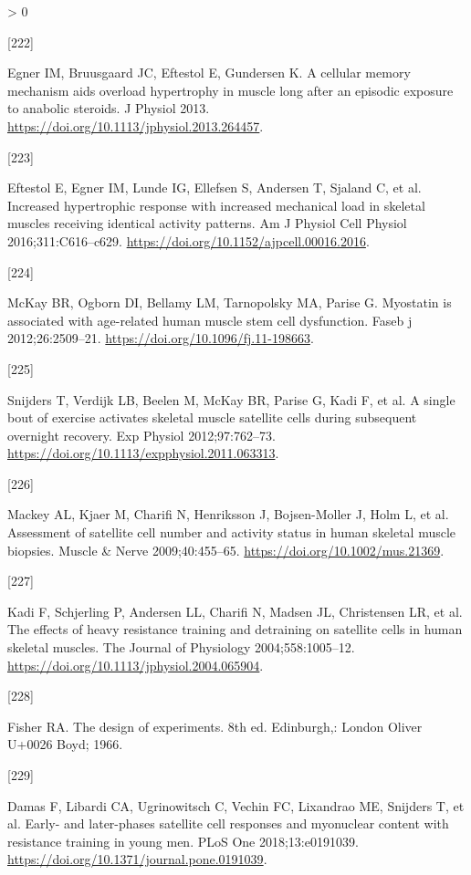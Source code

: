 \documentclass[twoside,10pt]{gihclass} %
\newlength{\cslhangindent}
\newlength{\csllabelwidth}
\newenvironment{CSLReferences}[3] %
 {%
  \setlength{\parindent}{0pt}
  \ifodd #1 \everypar{\setlength{\hangindent}{\cslhangindent}}\ignorespaces\fi
  \ifnum #2 > 0
  \setlength{\parskip}{#2\baselineskip}
  \fi
 }%
 {}
\newcommand{\CSLLeftMargin}[1]{\parbox[t]{\maxof{\widthof{#1}}{\csllabelwidth}}{#1}}
\newcommand{\CSLRightInline}[1]{\parbox[t]{\linewidth}{#1}}
\begin{document}
\begin{CSLReferences}{0}{0}
\leavevmode\hypertarget{ref-RN912}{}%
\CSLLeftMargin{{[}222{]} }
\CSLRightInline{Egner IM, Bruusgaard JC, Eftestol E, Gundersen K. A cellular memory mechanism aids overload hypertrophy in muscle long after an episodic exposure to anabolic steroids. J Physiol 2013. \url{https://doi.org/10.1113/jphysiol.2013.264457}.}

\leavevmode\hypertarget{ref-RN2104}{}%
\CSLLeftMargin{{[}223{]} }
\CSLRightInline{Eftestol E, Egner IM, Lunde IG, Ellefsen S, Andersen T, Sjaland C, et al. Increased hypertrophic response with increased mechanical load in skeletal muscles receiving identical activity patterns. Am J Physiol Cell Physiol 2016;311:C616--c629. \url{https://doi.org/10.1152/ajpcell.00016.2016}.}

\leavevmode\hypertarget{ref-RN2872}{}%
\CSLLeftMargin{{[}224{]} }
\CSLRightInline{McKay BR, Ogborn DI, Bellamy LM, Tarnopolsky MA, Parise G. Myostatin is associated with age-related human muscle stem cell dysfunction. Faseb j 2012;26:2509--21. \url{https://doi.org/10.1096/fj.11-198663}.}

\leavevmode\hypertarget{ref-RN1048}{}%
\CSLLeftMargin{{[}225{]} }
\CSLRightInline{Snijders T, Verdijk LB, Beelen M, McKay BR, Parise G, Kadi F, et al. A single bout of exercise activates skeletal muscle satellite cells during subsequent overnight recovery. Exp Physiol 2012;97:762--73. \url{https://doi.org/10.1113/expphysiol.2011.063313}.}

\leavevmode\hypertarget{ref-RN2081}{}%
\CSLLeftMargin{{[}226{]} }
\CSLRightInline{Mackey AL, Kjaer M, Charifi N, Henriksson J, Bojsen-Moller J, Holm L, et al. Assessment of satellite cell number and activity status in human skeletal muscle biopsies. Muscle \& Nerve 2009;40:455--65. \url{https://doi.org/10.1002/mus.21369}.}

\leavevmode\hypertarget{ref-RN2617}{}%
\CSLLeftMargin{{[}227{]} }
\CSLRightInline{Kadi F, Schjerling P, Andersen LL, Charifi N, Madsen JL, Christensen LR, et al. The effects of heavy resistance training and detraining on satellite cells in human skeletal muscles. The Journal of Physiology 2004;558:1005--12. \url{https://doi.org/10.1113/jphysiol.2004.065904}.}

\leavevmode\hypertarget{ref-RN2004}{}%
\CSLLeftMargin{{[}228{]} }
\CSLRightInline{Fisher RA. The design of experiments. 8th ed. Edinburgh,: London Oliver U+0026 Boyd; 1966.}

\leavevmode\hypertarget{ref-RN2112}{}%
\CSLLeftMargin{{[}229{]} }
\CSLRightInline{Damas F, Libardi CA, Ugrinowitsch C, Vechin FC, Lixandrao ME, Snijders T, et al. Early- and later-phases satellite cell responses and myonuclear content with resistance training in young men. PLoS One 2018;13:e0191039. \url{https://doi.org/10.1371/journal.pone.0191039}.}


\end{CSLReferences}
\end{document}
